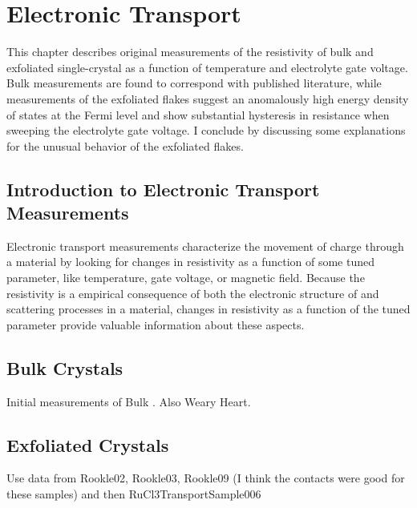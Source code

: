 \chapter{Electronic Transport}
This chapter describes original measurements of the resistivity of bulk and exfoliated single-crystal \rucl as a function of temperature and electrolyte gate voltage. Bulk measurements are found to correspond with published literature, while measurements of the exfoliated flakes suggest an anomalously high energy density of states at the Fermi level and show substantial hysteresis in resistance when sweeping the electrolyte gate voltage. I conclude by discussing some explanations for the unusual behavior of the exfoliated flakes.

\section{Introduction to Electronic Transport Measurements}

Electronic transport measurements characterize the movement of charge through a material by looking for changes in resistivity as a function of some tuned parameter, like temperature, gate voltage, or magnetic field. Because the resistivity is a empirical consequence of both the electronic structure of and scattering processes in a material, changes in resistivity as a function of the tuned parameter provide valuable information about these aspects.



\section{\texorpdfstring{\rucl}{RuCl3} Bulk Crystals}

Initial measurements of Bulk \ruclnospace . Also Weary Heart.

\section{Exfoliated \texorpdfstring{\rucl}{RuCl3} Crystals}

Use data from Rookle02, Rookle03, Rookle09 (I think the contacts were good for these samples) and then RuCl3TransportSample006